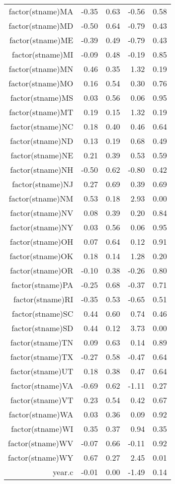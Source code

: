 \begin{table}[ht]
\begin{tabular}{rrrrr}
  factor(stname)MA & -0.35 & 0.63 & -0.56 & 0.58 \\ 
  factor(stname)MD & -0.50 & 0.64 & -0.79 & 0.43 \\ 
  factor(stname)ME & -0.39 & 0.49 & -0.79 & 0.43 \\ 
  factor(stname)MI & -0.09 & 0.48 & -0.19 & 0.85 \\ 
  factor(stname)MN & 0.46 & 0.35 & 1.32 & 0.19 \\ 
  factor(stname)MO & 0.16 & 0.54 & 0.30 & 0.76 \\ 
  factor(stname)MS & 0.03 & 0.56 & 0.06 & 0.95 \\ 
  factor(stname)MT & 0.19 & 0.15 & 1.32 & 0.19 \\ 
  factor(stname)NC & 0.18 & 0.40 & 0.46 & 0.64 \\ 
  factor(stname)ND & 0.13 & 0.19 & 0.68 & 0.49 \\ 
  factor(stname)NE & 0.21 & 0.39 & 0.53 & 0.59 \\ 
  factor(stname)NH & -0.50 & 0.62 & -0.80 & 0.42 \\ 
  factor(stname)NJ & 0.27 & 0.69 & 0.39 & 0.69 \\ 
  factor(stname)NM & 0.53 & 0.18 & 2.93 & 0.00 \\ 
  factor(stname)NV & 0.08 & 0.39 & 0.20 & 0.84 \\ 
  factor(stname)NY & 0.03 & 0.56 & 0.06 & 0.95 \\ 
  factor(stname)OH & 0.07 & 0.64 & 0.12 & 0.91 \\ 
  factor(stname)OK & 0.18 & 0.14 & 1.28 & 0.20 \\ 
  factor(stname)OR & -0.10 & 0.38 & -0.26 & 0.80 \\ 
  factor(stname)PA & -0.25 & 0.68 & -0.37 & 0.71 \\ 
  factor(stname)RI & -0.35 & 0.53 & -0.65 & 0.51 \\ 
  factor(stname)SC & 0.44 & 0.60 & 0.74 & 0.46 \\ 
  factor(stname)SD & 0.44 & 0.12 & 3.73 & 0.00 \\ 
  factor(stname)TN & 0.09 & 0.63 & 0.14 & 0.89 \\ 
  factor(stname)TX & -0.27 & 0.58 & -0.47 & 0.64 \\ 
  factor(stname)UT & 0.18 & 0.38 & 0.47 & 0.64 \\ 
  factor(stname)VA & -0.69 & 0.62 & -1.11 & 0.27 \\ 
  factor(stname)VT & 0.23 & 0.54 & 0.42 & 0.67 \\ 
  factor(stname)WA & 0.03 & 0.36 & 0.09 & 0.92 \\ 
  factor(stname)WI & 0.35 & 0.37 & 0.94 & 0.35 \\ 
  factor(stname)WV & -0.07 & 0.66 & -0.11 & 0.92 \\ 
  factor(stname)WY & 0.67 & 0.27 & 2.45 & 0.01 \\ 
  year.c & -0.01 & 0.00 & -1.49 & 0.14 \\ 
   \hline
\end{tabular}
\end{table}
